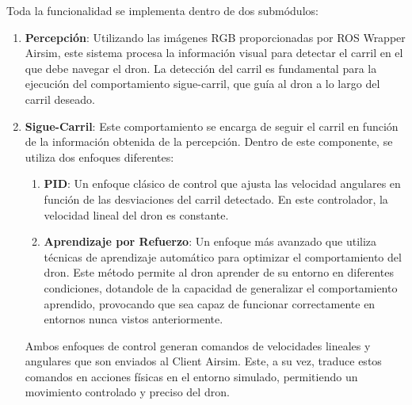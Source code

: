 Toda la funcionalidad se implementa dentro de dos submódulos:
\begin{enumerate}
  \item \textbf{Percepción}: Utilizando las imágenes RGB proporcionadas por ROS Wrapper Airsim, este sistema procesa la información
  visual para detectar el carril en el que debe navegar el dron. La detección del carril es fundamental para la ejecución del comportamiento sigue-carril, que guía al dron 
  a lo largo del carril deseado. 
  \item \textbf{Sigue-Carril}: Este comportamiento se encarga de seguir el carril en función de la información obtenida de la percepción. Dentro de este componente, se 
  utiliza dos enfoques diferentes: 
  \begin{enumerate}
    \item \textbf{PID}: Un enfoque clásico de control que ajusta las velocidad angulares en función de las desviaciones del carril detectado. En este controlador, la velocidad lineal 
    del dron es constante.
    \item \textbf{Aprendizaje por Refuerzo}: Un enfoque más avanzado que utiliza técnicas de aprendizaje automático para optimizar el comportamiento del dron. Este método 
    permite al dron aprender de su entorno en diferentes condiciones, dotandole de la capacidad de generalizar el comportamiento aprendido, provocando que sea capaz de funcionar correctamente
    en entornos nunca vistos anteriormente.

  \end{enumerate}

  Ambos enfoques de control generan comandos de velocidades lineales y angulares que son enviados al Client Airsim. Este, a su vez, traduce estos comandos en acciones físicas 
  en el entorno simulado, permitiendo un movimiento controlado y preciso del dron. 


\end{enumerate}

